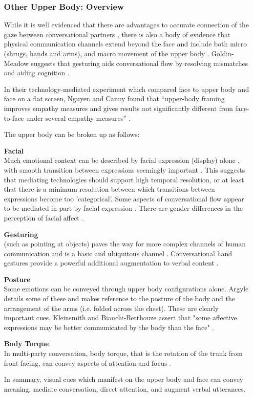 \subsubsection{Other Upper Body: Overview}
While it is well evidenced that there are advantages to accurate connection of the gaze between conversational partners \cite{Argyle1969, Kleinke1986}, there is also a body of evidence that physical communication channels extend beyond the face \cite{Kleinke1986, Nguyen2009} and include both micro (shrugs, hands and arms), and macro movement of the upper body \cite{Ekman1993}. Goldin-Meadow suggests that gesturing aids conversational flow by resolving mismatches and aiding cognition \cite{Goldin-Meadow1999}.\par
                    In their technology-mediated experiment which compared face to upper body and face on a flat screen, Nguyen and Canny found that ``upper-body framing improves empathy measures and gives results not significantly different from face-to-face under several empathy measures'' \cite{Nguyen2009}. 
                    
The upper body can be broken up as follows:\par
\textbf{Facial}\\Much emotional context can be described by facial expression (display) alone \cite{Ekman1993, Chovil1991}, with smooth transition between expressions seemingly important \cite{schiano2004}. This suggests that mediating technologies should support high temporal resolution, or at least that there is a minimum resolution between which transitions between expressions become too 'categorical'. Some aspects of conversational flow appear to be mediated in part by facial expression \cite{ohba1998}. There are gender differences in the perception of facial affect \cite{Hofmann2006}.\par
\textbf{Gesturing} \\(such as pointing at objects) paves the way for more complex channels of human communication and is a basic and ubiquitous channel \cite{Iverson2005}.  Conversational hand gestures provide a powerful additional augmentation to verbal content \cite{Krauss1996}.\par
\textbf{Posture} \\Some emotions can be conveyed through upper body configurations alone. Argyle details some of these \cite{Argyle1988} and makes reference to the posture of the body and the arrangement of the arms (i.e. folded across the chest). These are clearly important cues. Kleinsmith and Bianchi-Berthouze assert that "some affective expressions may be better communicated by the body than the face" \cite{Kleinsmith2013}.\par
\textbf{Body Torque} \\In multi-party conversation, body torque, that is the rotation of the trunk from front facing, can convey aspects of attention and focus \cite{Schegloff1998}.\par
In summary, visual cues which manifest on the upper body and face can convey meaning, mediate conversation, direct attention, and augment verbal utterances. \par
